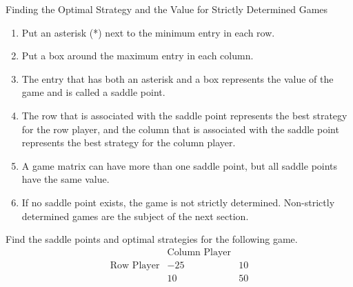\begin{summarybox}{Finding the Optimal Strategy and the Value for Strictly Determined Games}
    \begin{enumerate}
        \item Put an asterisk (*) next to the minimum entry in each row.
        \item Put a box around the maximum entry in each column.
        \item The entry that has both an asterisk and a box represents the value of the game and is called a saddle point.
        \item The row that is associated with the saddle point represents the best strategy for the row player, and the column that is associated with the saddle point represents the best strategy for the column player.
        \item A game matrix can have more than one saddle point, but all saddle points have the same value.
        \item If no saddle point exists, the game is not strictly determined. Non-strictly determined games are the subject of the next section.
    \end{enumerate}
\end{summarybox}

\begin{example}
    Find the saddle points and optimal strategies for the following game.
    \[
        \begin{array}{c|cc}
                              & \text{Column Player} &    \\
            \hline
            \text{Row Player} & -25                  & 10 \\
                              & 10                   & 50 \\
        \end{array}
    \]
\end{example}

